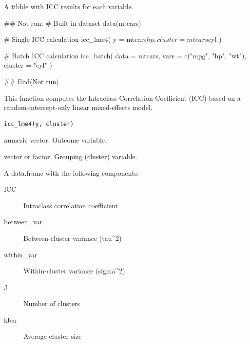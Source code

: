 \documentclass[a4paper]{book}
\begin{document}
%
\begin{Value}
A tibble with ICC results for each variable.
\end{Value}
%
\begin{Examples}
\begin{ExampleCode}
\#\# Not run: 
# Built-in dataset
data(mtcars)

# Single ICC calculation
icc_lme4(
  y = mtcars$hp,
  cluster = mtcars$cyl
)

# Batch ICC calculation
icc_batch(
  data = mtcars,
  vars = c("mpg", "hp", "wt"),
  cluster = "cyl"
)

## End(Not run)
\end{ExampleCode}
\end{Examples}
%
\begin{Description}
This function computes the Intraclass Correlation Coefficient (ICC)
based on a random-intercept-only linear mixed-effects model.
\end{Description}
%
\begin{Usage}
\begin{verbatim}
icc_lme4(y, cluster)
\end{verbatim}
\end{Usage}
%
\begin{Arguments}
\begin{ldescription}
\item[\code{y}] numeric vector. Outcome variable.

\item[\code{cluster}] vector or factor. Grouping (cluster) variable.
\end{ldescription}
\end{Arguments}
%
\begin{Value}
A data.frame with the following components:
\begin{description}

\item[ICC] Intraclass correlation coefficient
\item[between\_var] Between-cluster variance (tau\textasciicircum{}2)
\item[within\_var] Within-cluster variance (sigma\textasciicircum{}2)
\item[J] Number of clusters
\item[kbar] Average cluster size

\end{description}

\end{Value}
\end{document}
